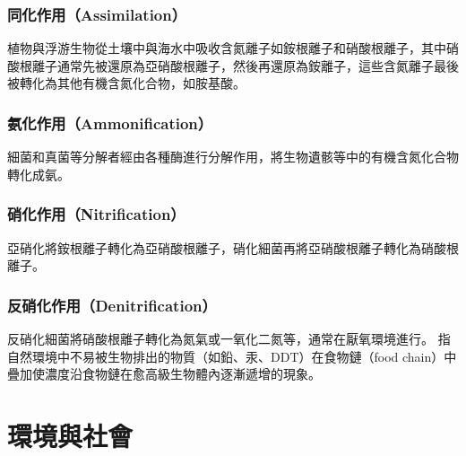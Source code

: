 \documentclass[a4paper,12pt]{report}
\begin{document}
\begin{itemize}
\subsubsection{同化作用（Assimilation）}
植物與浮游生物從土壤中與海水中吸收含氮離子如銨根離子和硝酸根離子，其中硝酸根離子通常先被還原為亞硝酸根離子，然後再還原為銨離子，這些含氮離子最後被轉化為其他有機含氮化合物，如胺基酸。
\subsubsection{氨化作用（Ammonification）}
細菌和真菌等分解者經由各種酶進行分解作用，將生物遺骸等中的有機含氮化合物轉化成氨。
\subsubsection{硝化作用（Nitrification）}
亞硝化將銨根離子轉化為亞硝酸根離子，硝化細菌再將亞硝酸根離子轉化為硝酸根離子。
\subsubsection{反硝化作用（Denitrification）}
反硝化細菌將硝酸根離子轉化為氮氣或一氧化二氮等，通常在厭氧環境進行。
指自然環境中不易被生物排出的物質（如鉛、汞、DDT）在食物鏈（food chain）中疊加使濃度沿食物鏈在愈高級生物體內逐漸遞增的現象。


\section{環境與社會}

\end{itemize}
\end{document}
